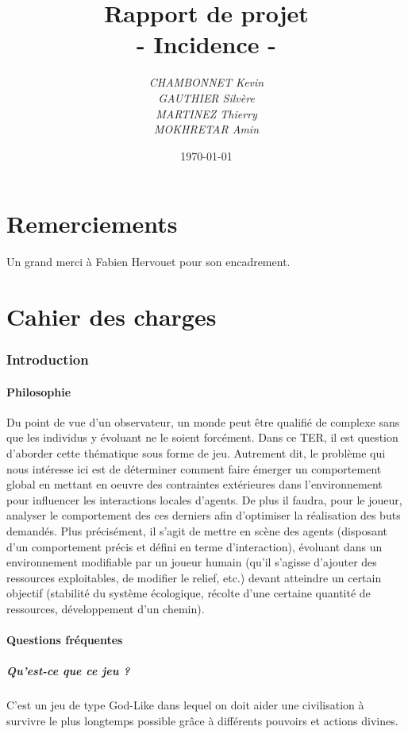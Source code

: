 \documentclass[a4paper]{article}
\title{\textbf{Rapport de projet}\\- \Huge{Incidence} -}
\author{\emph{CHAMBONNET Kevin}\\\emph{GAUTHIER Silvère}\\\emph{MARTINEZ Thierry}\\\emph{MOKHRETAR Amin}}
\date{\today}
\newcommand{\alinea}{\hspace*{0.5cm}}
\begin{document}
  \maketitle
  \newpage
  \tableofcontents
  
  \newpage
  \part{Remerciements}
  		
		Un grand merci à Fabien Hervouet pour son encadrement.
		
  \newpage
  \part{Cahier des charges}
  
    \section{Introduction}
      \subsection{Philosophie}
        \alinea Du point de vue d’un observateur, un monde peut être qualifié de complexe sans que les individus y évoluant ne le soient forcément. Dans ce TER, il est question d’aborder cette thématique sous forme de jeu. Autrement dit, le problème qui nous intéresse ici est de déterminer comment faire émerger un comportement global en mettant en oeuvre des contraintes extérieures dans l’environnement pour influencer les interactions locales d’agents. De plus il faudra, pour le joueur, analyser le comportement des ces derniers afin d’optimiser la réalisation des buts demandés. Plus précisément, il s’agit de mettre en scène des agents (disposant d’un comportement précis et défini en terme d’interaction), évoluant dans un environnement modifiable par un joueur humain (qu’il s’agisse d’ajouter des ressources exploitables, de modifier le relief, etc.) devant atteindre un certain objectif (stabilité du système écologique, récolte d’une certaine quantité de ressources, développement d’un chemin).

      \subsection{Questions fréquentes}
        \subsubsection{Qu'est-ce que ce jeu ?}
          \alinea C'est un jeu de type God-Like dans lequel on doit aider une civilisation à survivre le plus longtemps possible grâce à différents pouvoirs et actions divines.
			
\end{document}
